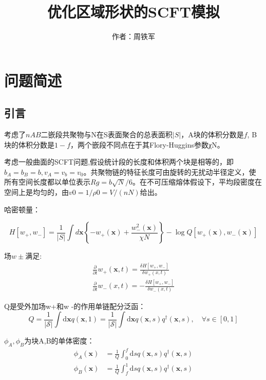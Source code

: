 \documentclass[12pt,a4paper]{article}
\title{优化区域形状的SCFT模拟}
\author{作者：周铁军}
\date{\chntoday}
\begin{document}
\maketitle
\newpage


\section{问题简述}
\subsection{引言}
考虑了$n AB$二嵌段共聚物与N在S表面聚合的总表面积$|S|$，A块的体积分数是$f$, B块的体积分数是$1 - f$，两个嵌段不同点在于其Flory-Huggins参数χN。

考虑一般曲面的SCFT问题,假设统计段的长度和体积两个块是相等的，即$ b_A = b_B = b, v_A = v_b = v_0$。共聚物链的特征长度可由旋转的无扰动半径定义，使所有空间长度都以单位表示$Rg = b\sqrt{N}/6$。在不可压缩熔体假设下，平均段密度在空间上是均匀的，由$v0 = 1/ρ0 = V/(nN)$给出。

哈密顿量：

\begin{equation}
	H\left[w_{+}, w_{-}\right]=\frac{1}{|S|} \int d \mathbf{x}\left\{-w_{+}(\mathbf{x})+\frac{w_{-}^{2}(\mathbf{x})}{\chi N}\right\}-\log Q\left[w_{+}(\mathbf{x}), w_{-}(\mathbf{x})\right]
\end{equation}

场$w\pm$满足:
\begin{equation}
	\begin{array}{l}{\frac{\partial}{\partial t} w_{+}(\mathbf{x}, t)=\frac{\delta H\left[w_{+}, w_{-}\right]}{\delta w_{+}(x, t)}} \\ {\frac{\partial}{\partial t} w_{-}(x, t)=-\frac{\delta H\left[w_{+}, w_{-}\right]}{\delta w_{-}(x, t)}}\end{array}
\end{equation}

Q是受外加场w+和w -的作用单链配分泛函：
\begin{equation}
Q=\frac{1}{|\mathcal{S}|} \int \mathrm{d} \mathbf{x} q(\mathbf{x}, 1)=\frac{1}{|\mathcal{S}|} \int \mathrm{d} \mathbf{x} q(\mathbf{x}, s) q^{\dagger}(\mathbf{x}, s), \quad \forall s \in[0,1]
\end{equation}

$\phi_A,\phi_B$为块A,B的单体密度：
\begin{equation}
\begin{aligned} \phi_{A}(\mathbf{x}) &=\frac{1}{Q} \int_{0}^{f} \mathrm{d} s q(\mathbf{x}, s) q^{\dagger}(\mathbf{x}, s) \\ \phi_{B}(\mathbf{x}) &=\frac{1}{Q} \int_{f}^{1} \mathrm{d} s q(\mathbf{x}, s) q^{\dagger}(\mathbf{x}, s) \end{aligned}
\end{equation}
\end{document}
